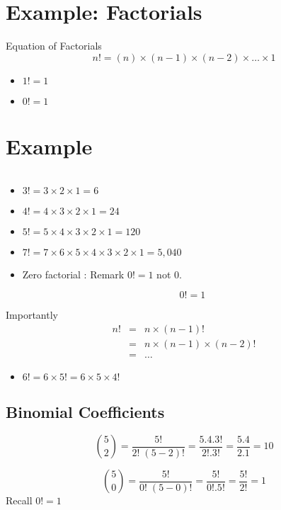\documentclass[]{report}
\begin{document}
\section*{Example: Factorials }


\begin{framed}
\noindent Equation of Factorials 
		\[ n! = (n)\times (n-1)\times(n-2) \times \ldots \times 1 \]
\end{framed}
\begin{itemize}
	\item $1! = 1$
	\item $0! = 1 $
\end{itemize}

\section*{Example}
	
\[\]



\begin{itemize}
	\item $3!  = 3 \times 2  \times 1 = 6 $
		\item $4! = 4 \times 3 \times 2 \times 1 = 24$
		\item $5! = 5 \times 4 \times 3 \times 2 \times 1 = 120 $

		\item $7! = 7 \times 6 \times 5 \times 4 \times 3 \times 2 \times 1 = 5,040$
		\item Zero factorial : Remark $0! = 1$ not $0$.

	\[ 0! =  1 \]


	
	
\end{itemize}	

\begin{framed}
Importantly 
\begin{eqnarray}
n! &=& n \times (n-1)! \\  &=& n \times (n-1) \times (n-2)!
\\  &=& \ldots
\end{eqnarray}
\end{framed}
\begin{itemize}
	\item $6! = 6 \times 5!  = 6 \times 5 \times 4!$ 
\end{itemize}
\subsection*{Binomial Coefficients}

\[ \binom 5 2  = \frac{5!}{2!\;(5-2)!} = \frac{5.4.3!}{2! .3!} = \frac{5.4}{2.1} = 10\]


\[ \binom 5 0   = \frac{5!}{0!\;(5-0)!} = \frac{5!}{0! .5!} = \frac{5!}{2!} = 1\]
Recall $0! =1$
\end{document}
